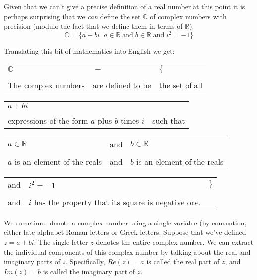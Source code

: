 \documentclass[10pt,]{book}
\theoremstyle{plain}
\theoremstyle{definition}
\theoremstyle{definition}
\numberwithin{equation}{section}
\newcommand{\hrulethin}  {\noalign{\hrule height 0.04em}}
\newcommand{\suchthat}{\;  \;}
\newcommand{\Reals}{{\mathbb R}}
\newcommand{\Complexes}{{\mathbb C}}
\begin{document}
    Given that we can't give a precise definition of a real number at this
    point it is perhaps surprising that we \emph{can} define the set
    \(\Complexes\) of complex numbers with precision
    (modulo the fact that we define them in terms of \(\Reals\)).
    \begin{equation*}
      \Complexes = \{ a + bi \suchthat a \in \Reals \; \mbox{and}  \; b \in
      \Reals \; \mbox{and}  \; i^2 = -1 \}
    \end{equation*}
\par

    Translating this bit of mathematics into English we get:
\begin{tabular}{lll}
\(\Complexes\)&\(=\)&\(\{\)\tabularnewline[0pt]
&&\tabularnewline\hrulethin
The complex numbers&are defined to be&the set of all
\end{tabular}
\begin{tabular}{ll}
\(a+bi\)&\(\suchthat\)\tabularnewline[0pt]
&\tabularnewline\hrulethin
expressions of the form \(a\) plus \(b\) times \(i\)&such that
\end{tabular}
\begin{tabular}{lll}
\(a \in \Reals\)&and&\(b \in \Reals\)\tabularnewline[0pt]
&&\tabularnewline\hrulethin
\(a\) is an element of the reals&and&\(b\) is an
      element of the reals
\end{tabular}
\begin{tabular}{lll}
and&\(i^2 = -1\)&\(\}\)\tabularnewline[0pt]
&&\tabularnewline\hrulethin
and&\(i\) has the property that its
      square is negative one.&
\end{tabular}
\par

    We sometimes denote a complex number using a single variable (by
    convention, either late alphabet Roman letters or Greek letters.
    Suppose that we've defined \(z = a + bi\). The single letter \(z\)
    denotes the entire complex number. We can extract the individual
    components of this complex number by talking about the
    real and
    imaginary parts of \(z\).
    Specifically, \(Re(z) = a\) is called the
    real part of \(z\), and \(Im(z) = b\) is called the imaginary part of
    \(z\).
\par
\end{document}

